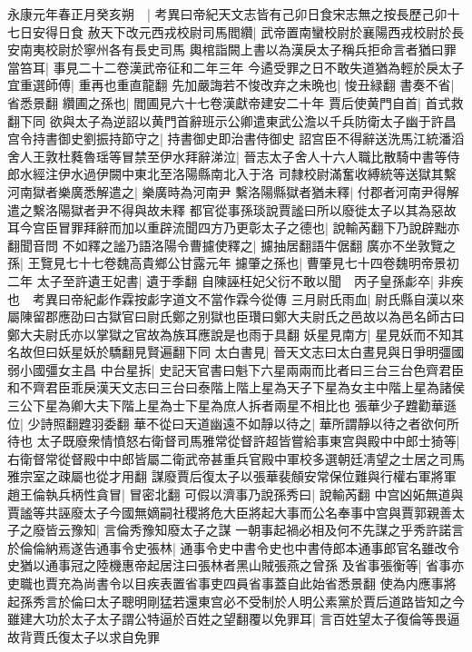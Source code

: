 永康元年春正月癸亥朔　|{
	考異曰帝紀天文志皆有己卯日食宋志無之按長歷己卯十七日安得日食}
赦天下改元西戎校尉司馬閻纘|{
	武帝置南蠻校尉於襄陽西戎校尉於長安南夷校尉於寧州各有長史司馬}
輿棺詣闕上書以為漢戾太子稱兵拒命言者猶曰罪當笞耳|{
	事見二十二卷漢武帝征和二年三年}
今遹受罪之日不敢失道猶為輕於戾太子宜重選師傅|{
	重再也重直龍翻}
先加嚴誨若不悛改弃之未晩也|{
	悛丑緑翻}
書奏不省|{
	省悉景翻}
纘圃之孫也|{
	閻圃見六十七卷漢獻帝建安二十年}
賈后使黄門自首|{
	首式救翻下同}
欲與太子為逆詔以黄門首辭班示公卿遣東武公澹以千兵防衛太子幽于許昌宫令持書御史劉振持節守之|{
	持書御史即治書侍御史}
詔宫臣不得辭送洗馬江統潘滔舍人王敦杜蕤魯瑶等冒禁至伊水拜辭涕泣|{
	晉志太子舍人十六人職比散騎中書等侍郎水經注伊水過伊闕中東北至洛陽縣南北入于洛}
司隸校尉滿奮收縛統等送獄其繫河南獄者樂廣悉解遣之|{
	樂廣時為河南尹}
繫洛陽縣獄者猶未釋|{
	付郡者河南尹得解遣之繫洛陽獄者尹不得與故未釋}
都官從事孫琰說賈謐曰所以廢徙太子以其為惡故耳今宫臣冒罪拜辭而加以重辟流聞四方乃更彰太子之德也|{
	說輸芮翻下乃說辟黜亦翻聞音問}
不如釋之謐乃語洛陽令曹攄使釋之|{
	攄抽居翻語牛倨翻}
廣亦不坐敦覽之孫|{
	王覽見七十七卷魏高貴鄉公甘露元年}
攄肇之孫也|{
	曹肇見七十四卷魏明帝景初二年}
太子至許遺王妃書|{
	遺于季翻}
自陳誣枉妃父衍不敢以聞　丙子皇孫虨卒|{
	非疾也　考異曰帝紀虨作霖按虨字道文不當作霖今從傳}
三月尉氏雨血|{
	尉氏縣自漢以來屬陳留郡應劭曰古獄官曰尉氏鄭之别獄也臣瓚曰鄭大夫尉氏之邑故以為邑名師古曰鄭大夫尉氏亦以掌獄之官故為族耳應說是也雨于具翻}
妖星見南方|{
	星見妖而不知其名故但曰妖星妖於驕翻見賢遍翻下同}
太白書見|{
	晉天文志曰太白晝見與日爭明彊國弱小國彊女主昌}
中台星拆|{
	史記天官書曰魁下六星兩兩而比者曰三台三台色齊君臣和不齊君臣乖戾漢天文志曰三台曰泰階上階上星為天子下星為女主中階上星為諸侯三公下星為卿大夫下階上星為士下星為庶人拆者兩星不相比也}
張華少子韙勸華遜位|{
	少詩照翻韙羽委翻}
華不從曰天道幽遠不如靜以待之|{
	華所謂靜以待之者欲何所待也}
太子既廢衆情憤怒右衛督司馬雅常從督許超皆嘗給事東宫與殿中中郎士猗等|{
	右衛督常從督殿中中郎皆屬二衛武帝甚重兵官殿中軍校多選朝廷凊望之士居之司馬雅宗室之疎屬也從才用翻}
謀廢賈后復太子以張華裴頠安常保位難與行權右軍將軍趙王倫執兵柄性貪冒|{
	冒密北翻}
可假以濟事乃說孫秀曰|{
	說輸芮翻}
中宫凶妬無道與賈謐等共誣廢太子今國無嫡嗣社稷將危大臣將起大事而公名奉事中宫與賈郭親善太子之廢皆云豫知|{
	言倫秀豫知廢太子之謀}
一朝事起禍必相及何不先謀之乎秀許諾言於倫倫納焉遂告通事令史張林|{
	通事令史中書令史也中書侍郎本通事郎官名雖改令史猶以通事冠之陸機惠帝起居注曰張林者黑山賊張燕之曾孫}
及省事張衡等|{
	省事亦吏職也賈充為尚書令以目疾表置省事吏四員省事蓋自此始省悉景翻}
使為内應事將起孫秀言於倫曰太子聰明剛猛若還東宫必不受制於人明公素黨於賈后道路皆知之今雖建大功於太子太子謂公特逼於百姓之望翻覆以免罪耳|{
	言百姓望太子復倫等畏逼故背賈氏復太子以求自免罪}
